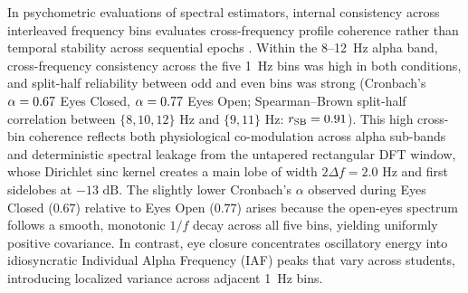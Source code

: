\documentclass[11pt,letterpaper]{article}
\begin{document}
In psychometric evaluations of spectral estimators, internal consistency across interleaved frequency bins evaluates cross-frequency profile coherence rather than temporal stability across sequential epochs \citep{clayson2017,pontifex2010}. Within the 8--12~Hz alpha band, cross-frequency consistency across the five 1~Hz bins was high in both conditions, and split-half reliability between odd and even bins was strong (Cronbach's $\alpha = 0.67$ Eyes Closed, $\alpha = 0.77$ Eyes Open; Spearman--Brown split-half correlation between $\{8, 10, 12\}\text{ Hz}$ and $\{9, 11\}\text{ Hz}$: $r_{\text{SB}} = 0.91$). This high cross-bin coherence reflects both physiological co-modulation across alpha sub-bands and deterministic spectral leakage from the untapered rectangular DFT window, whose Dirichlet sinc kernel creates a main lobe of width $2\Delta f = 2.0\text{ Hz}$ and first sidelobes at $-13\text{ dB}$. The slightly lower Cronbach's $\alpha$ observed during Eyes Closed ($0.67$) relative to Eyes Open ($0.77$) arises because the open-eyes spectrum follows a smooth, monotonic $1/f$ decay across all five bins, yielding uniformly positive covariance. In contrast, eye closure concentrates oscillatory energy into idiosyncratic Individual Alpha Frequency (IAF) peaks that vary across students, introducing localized variance across adjacent 1~Hz bins.
\end{document}
